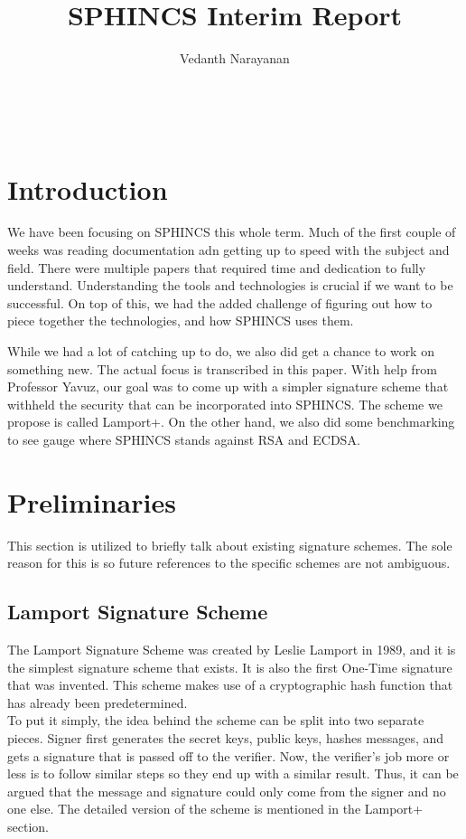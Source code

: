 \documentclass[]{scrartcl}
\title{SPHINCS Interim Report}
\author{Vedanth Narayanan}
\makeatletter
\renewcommand{\maketitle}{ %
	\begin{center} %
		{\LARGE\@title} %
		
		\vspace{15pt} %
		{\large\@author} %
		\\\@date %
		
	\end{center}
}
\makeatother
\begin{document}
\maketitle


\section*{Introduction}
We have been focusing on SPHINCS this whole term. Much of the first couple of weeks was reading documentation adn getting up to speed with the subject and field. There were multiple papers that required time and dedication to fully understand. Understanding the tools and technologies is crucial if we want to be successful. On top of this, we had the added challenge of figuring out how to piece together the technologies, and how SPHINCS uses them.

While we had a lot of catching up to do, we also did get a chance to work on something new. The actual focus is transcribed in this paper. With help from Professor Yavuz, our goal was to come up with a simpler signature scheme that withheld the security that can be incorporated into SPHINCS. The scheme we propose is called Lamport+. On the other hand, we also did some benchmarking to see gauge where SPHINCS stands against RSA and ECDSA.

\section*{Preliminaries}
\vspace{-0.3cm}This section is utilized to briefly talk about existing signature schemes. The sole reason for this is so future references to the specific schemes are not ambiguous. 

\subsection*{Lamport Signature Scheme}
The Lamport Signature Scheme was created by Leslie Lamport in 1989, and it is the simplest signature scheme that exists. It is also the first One-Time signature that was invented. This scheme makes use of a cryptographic hash function that has already been predetermined.\\
To put it simply, the idea behind the scheme can be split into two separate pieces. Signer first generates the secret keys, public keys, hashes messages, and gets a signature that is passed off to the verifier. Now, the verifier's job more or less is to follow similar steps so they end up with a similar result. Thus, it can be argued that the message and signature could only come from the signer and no one else. The detailed version of the scheme is mentioned in the Lamport+ section.
\end{document}
